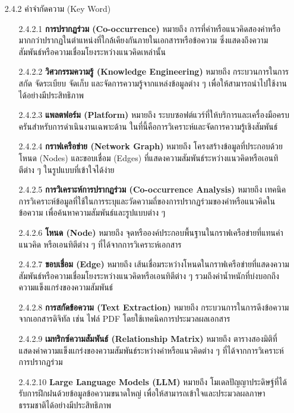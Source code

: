 \documentclass[12pt,a4paper]{article}
\begin{document}
\begin{enumerate}[leftmargin=2cm]
{\begin{enumerate}
            \item[2.4.2] คำจำกัดความ (Key Word)
            \vspace{0.05cm}
            \begin{enumerate}
                \item[2.4.2.1] \textbf{การปรากฏร่วม (Co-occurrence)} หมายถึง การที่คำหรือแนวคิดสองคำหรือมากกว่าปรากฏในตำแหน่งที่ใกล้เคียงกันภายในเอกสารหรือข้อความ ซึ่งแสดงถึงความสัมพันธ์หรือความเชื่อมโยงระหว่างแนวคิดเหล่านั้น
                \item[2.4.2.2] \textbf{วิศวกรรมความรู้ (Knowledge Engineering)} หมายถึง กระบวนการในการสกัด จัดระเบียบ จัดเก็บ และจัดการความรู้จากแหล่งข้อมูลต่าง ๆ เพื่อให้สามารถนำไปใช้งานได้อย่างมีประสิทธิภาพ
                \item[2.4.2.3] \textbf{แพลตฟอร์ม (Platform)} หมายถึง ระบบซอฟต์แวร์ที่ให้บริการและเครื่องมือครบครันสำหรับการดำเนินงานเฉพาะด้าน ในที่นี้คือการวิเคราะห์และจัดการความรู้เชิงสัมพันธ์
                \item[2.4.2.4] \textbf{กราฟเครือข่าย (Network Graph)} หมายถึง โครงสร้างข้อมูลที่ประกอบด้วยโหนด (Nodes) และขอบเชื่อม (Edges) ที่แสดงความสัมพันธ์ระหว่างแนวคิดหรือเอนทิตีต่าง ๆ ในรูปแบบที่เข้าใจได้ง่าย
                \item[2.4.2.5] \textbf{การวิเคราะห์การปรากฏร่วม (Co-occurrence Analysis)} หมายถึง เทคนิคการวิเคราะห์ข้อมูลที่ใช้ในการระบุและวัดความถี่ของการปรากฏร่วมของคำหรือแนวคิดในข้อความ เพื่อค้นหาความสัมพันธ์และรูปแบบต่าง ๆ
                \item[2.4.2.6] \textbf{โหนด (Node)} หมายถึง จุดหรือองค์ประกอบพื้นฐานในกราฟเครือข่ายที่แทนคำ แนวคิด หรือเอนทิตีต่าง ๆ ที่ได้จากการวิเคราะห์เอกสาร
                \item[2.4.2.7] \textbf{ขอบเชื่อม (Edge)} หมายถึง เส้นเชื่อมระหว่างโหนดในกราฟเครือข่ายที่แสดงความสัมพันธ์หรือความเชื่อมโยงระหว่างแนวคิดหรือเอนทิตีต่าง ๆ รวมถึงค่าน้ำหนักที่บ่งบอกถึงความแข็งแกร่งของความสัมพันธ์
                \item[2.4.2.8] \textbf{การสกัดข้อความ (Text Extraction)} หมายถึง กระบวนการในการดึงข้อความจากเอกสารดิจิทัล เช่น ไฟล์ PDF โดยใช้เทคนิคการประมวลผลเอกสาร
                \item[2.4.2.9] \textbf{เมทริกซ์ความสัมพันธ์ (Relationship Matrix)} หมายถึง ตารางสองมิติที่แสดงค่าความแข็งแกร่งของความสัมพันธ์ระหว่างคำหรือแนวคิดต่าง ๆ ที่ได้จากการวิเคราะห์การปรากฏร่วม
                \item[2.4.2.10] \textbf{Large Language Models (LLM)} หมายถึง โมเดลปัญญาประดิษฐ์ที่ได้รับการฝึกฝนด้วยข้อมูลข้อความขนาดใหญ่ เพื่อให้สามารถเข้าใจและประมวลผลภาษาธรรมชาติได้อย่างมีประสิทธิภาพ

\end{enumerate}
\end{enumerate}}
\end{enumerate}
\end{document}
